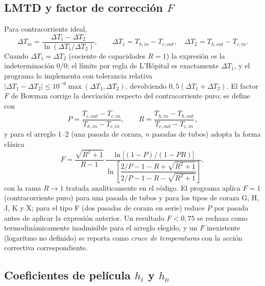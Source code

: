 \documentclass[11pt,a4paper]{article}
\begin{document}
\subsection{LMTD y factor de correcci\'on $F$}

Para contracorriente ideal,
\begin{equation}
\Delta T_m = \frac{\Delta T_1 - \Delta T_2}{\ln(\Delta T_1/\Delta T_2)},
\qquad
\Delta T_1 = T_{h,in} - T_{c,out},\quad
\Delta T_2 = T_{h,out} - T_{c,in}.
\end{equation}
Cuando $\Delta T_1 = \Delta T_2$ (cociente de capacidades $R = 1$) la
expresi\'on es la indeterminaci\'on $0/0$; el l\'imite por regla de L'H\^opital
es exactamente $\Delta T_1$, y el programa lo implementa con tolerancia
relativa $|\Delta T_1 - \Delta T_2| \le 10^{-6}\max(\Delta T_1,\Delta T_2)$,
devolviendo $0{,}5(\Delta T_1+\Delta T_2)$. El factor $F$ de Bowman corrige la
desviaci\'on respecto del contracorriente puro; se define con
\begin{equation}
P = \frac{T_{c,out}-T_{c,in}}{T_{h,in}-T_{c,in}}, \qquad
R = \frac{T_{h,in}-T_{h,out}}{T_{c,out}-T_{c,in}},
\end{equation}
y para el arreglo 1--2 (una pasada de coraza, $n$ pasadas de tubos) adopta la
forma cl\'asica
\begin{equation}
F = \frac{\sqrt{R^2+1}}{R-1}\,
\frac{\ln\!\big[(1-P)/(1-PR)\big]}
{\ln\!\left[\dfrac{2/P - 1 - R + \sqrt{R^2+1}}
{2/P - 1 - R - \sqrt{R^2+1}}\right]} ,
\end{equation}
con la rama $R \to 1$ tratada anal\'iticamente en el c\'odigo. El programa
aplica $F = 1$ (contracorriente puro) para una pasada de tubos y para los
tipos de coraza G, H, J, K y X; para el tipo F (dos pasadas de coraza en
serie) reduce $P$ por pasada antes de aplicar la expresi\'on anterior. Un
resultado $F < 0{,}75$ se rechaza como termodin\'amicamente inadmisible para el
arreglo elegido, y un $F$ inexistente (logaritmo no definido) se reporta como
\emph{cruce de temperaturas} con la acci\'on correctiva correspondiente.

\subsection{Coeficientes de pel\'icula $h_i$ y $h_o$}
\end{document}
